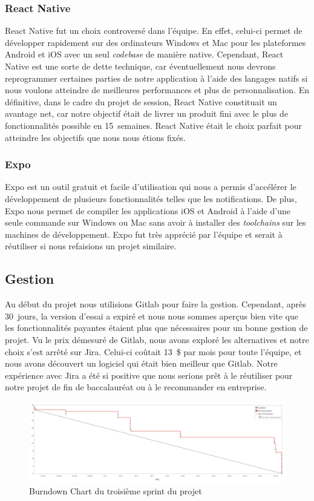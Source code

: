         \subsubsection{React Native}
        React Native fut un choix controversé dans l'équipe. En effet, celui-ci permet de développer rapidement sur des ordinateurs Windows et Mac pour les plateformes Android et iOS avec un seul \emph{codebase} de manière native. Cependant, React Native est une sorte de dette technique, car éventuellement nous devrons reprogrammer certaines parties de notre application à l'aide des langages natifs si nous voulons atteindre de meilleures performances et plus de personnalisation. En définitive, dans le cadre du projet de session, React Native constituait un avantage net, car notre objectif était de livrer un produit fini avec le plus de fonctionnalités possible en 15~semaines. React Native était le choix parfait pour atteindre les objectifs que nous nous étions fixés.

        \subsubsection{Expo}
        Expo est un outil gratuit et facile d'utilisation qui nous a permis d'accélérer le développement de plusieurs fonctionnalités telles que les notifications. De plus, Expo nous permet de compiler les applications iOS et Android à l'aide d'une seule commande sur Windows ou Mac sans avoir à installer des \emph{toolchains} sur les machines de développement. Expo fut très apprécié par l'équipe et serait à réutiliser si nous refaisions un projet similaire.
        
    \subsection{Gestion}
    Au début du projet nous utilisions Gitlab pour faire la gestion. Cependant, après 30~jours, la version d'essai a expiré et nous nous sommes aperçus bien vite que les fonctionnalités payantes étaient plus que nécessaires pour un bonne gestion de projet. Vu le prix démesuré de Gitlab, nous avons exploré les alternatives et notre choix s'est arrêté sur Jira. Celui-ci coûtait 13~\$ par mois pour toute l'équipe, et nous avons découvert un logiciel qui était bien meilleur que Gitlab. Notre expérience avec Jira a été si positive que nous serions prêt à le réutiliser pour notre projet de fin de baccalauréat ou à le recommander en entreprise.

    \begin{figure}[hp] \centering
        \includegraphics[width=\textwidth]{Figures/burndown}
        \caption{Burndown Chart du troisième sprint du projet}
        \label{fig.burndown}
    \end{figure}

